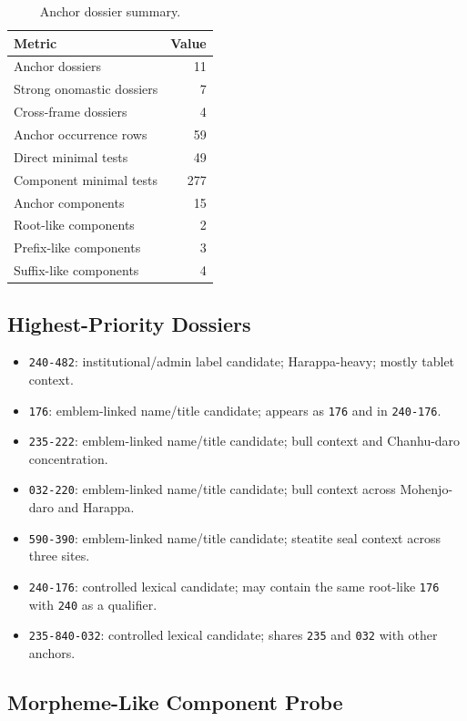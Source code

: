 \begin{table}[htbp]
\centering
\begin{tabular}{lr}
\toprule
\textbf{Metric} & \textbf{Value} \\
\midrule
Anchor dossiers & 11 \\
Strong onomastic dossiers & 7 \\
Cross-frame dossiers & 4 \\
Anchor occurrence rows & 59 \\
Direct minimal tests & 49 \\
Component minimal tests & 277 \\
Anchor components & 15 \\
Root-like components & 2 \\
Prefix-like components & 3 \\
Suffix-like components & 4 \\
\bottomrule
\end{tabular}
\caption{Anchor dossier summary.}
\label{tab:anchor-dossier-summary}
\end{table}

\subsection{Highest-Priority Dossiers}

\begin{itemize}
  \item \texttt{240-482}: institutional/admin label candidate; Harappa-heavy; mostly tablet context.
  \item \texttt{176}: emblem-linked name/title candidate; appears as \texttt{176} and in \texttt{240-176}.
  \item \texttt{235-222}: emblem-linked name/title candidate; bull context and Chanhu-daro concentration.
  \item \texttt{032-220}: emblem-linked name/title candidate; bull context across Mohenjo-daro and Harappa.
  \item \texttt{590-390}: emblem-linked name/title candidate; steatite seal context across three sites.
  \item \texttt{240-176}: controlled lexical candidate; may contain the same root-like \texttt{176} with \texttt{240} as a qualifier.
  \item \texttt{235-840-032}: controlled lexical candidate; shares \texttt{235} and \texttt{032} with other anchors.
\end{itemize}

\subsection{Morpheme-Like Component Probe}

